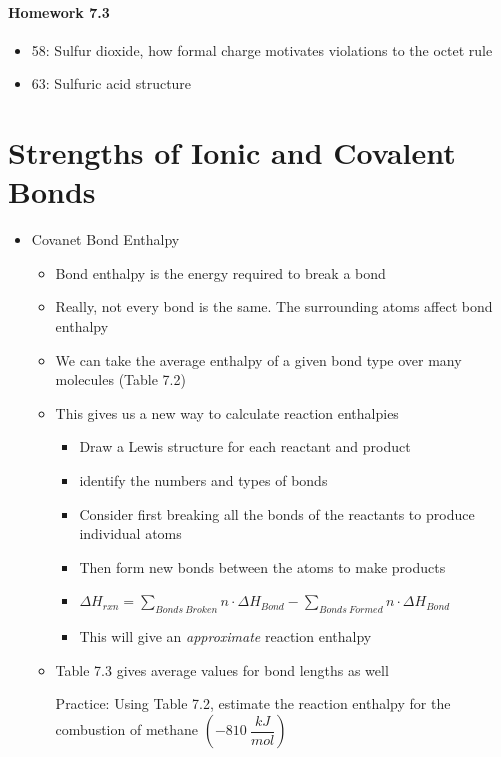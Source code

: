\documentclass[12pt, openany, letterpaper]{memoir}
\begin{document}
\paragraph*{Homework 7.3}
\begin{itemize}
  \item 58: Sulfur dioxide, how formal charge motivates violations to the octet rule
  \item 63: Sulfuric acid structure
\end{itemize}

\section{Strengths of Ionic and Covalent Bonds}
\begin{itemize}
  \item Covanet Bond Enthalpy
    \begin{itemize}
      \item Bond enthalpy is the energy required to break a bond
      \item Really, not every  bond is the same. The surrounding atoms affect bond enthalpy
      \item We can take the average enthalpy of a given bond type over many molecules (Table 7.2)
      \item This gives us a new way to calculate reaction enthalpies
            \begin{itemize}
              \item Draw a Lewis structure for each reactant and product
              \item identify the numbers and types of bonds
              \item Consider first breaking all the bonds of the reactants to produce individual atoms
              \item Then form new bonds between the atoms to make products
              \item $\Delta H_{rxn}=\sum\limits_{Bonds~Broken} n\cdot \Delta H_{Bond} - \sum\limits_{Bonds~Formed}n\cdot \Delta H_{Bond}$
              \item This will give an \emph{approximate} reaction enthalpy
            \end{itemize}
      \item Table 7.3 gives average values for bond lengths as well

            Practice: Using Table 7.2, estimate the reaction enthalpy for the combustion of methane $\left(-810~\dfrac{kJ}{mol}\right)$
    \end{itemize}
\end{itemize}
\end{document}
